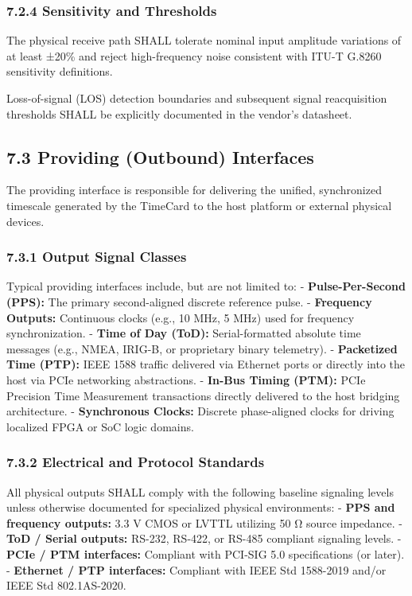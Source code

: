 \documentclass[
]{article}
\begin{document}
\subsubsection{7.2.4 Sensitivity and
Thresholds}\label{sensitivity-and-thresholds}

The physical receive path SHALL tolerate nominal input amplitude
variations of at least ±20\% and reject high-frequency noise consistent
with ITU-T G.8260 sensitivity definitions.

Loss-of-signal (LOS) detection boundaries and subsequent signal
reacquisition thresholds SHALL be explicitly documented in the vendor's
datasheet.

\subsection{7.3 Providing (Outbound)
Interfaces}\label{providing-outbound-interfaces}

The providing interface is responsible for delivering the unified,
synchronized timescale generated by the TimeCard to the host platform or
external physical devices.

\subsubsection{7.3.1 Output Signal Classes}\label{output-signal-classes}

Typical providing interfaces include, but are not limited to: -
\textbf{Pulse-Per-Second (PPS):} The primary second-aligned discrete
reference pulse. - \textbf{Frequency Outputs:} Continuous clocks (e.g.,
10 MHz, 5 MHz) used for frequency synchronization. - \textbf{Time of Day
(ToD):} Serial-formatted absolute time messages (e.g., NMEA, IRIG-B, or
proprietary binary telemetry). - \textbf{Packetized Time (PTP):} IEEE
1588 traffic delivered via Ethernet ports or directly into the host via
PCIe networking abstractions. - \textbf{In-Bus Timing (PTM):} PCIe
Precision Time Measurement transactions directly delivered to the host
bridging architecture. - \textbf{Synchronous Clocks:} Discrete
phase-aligned clocks for driving localized FPGA or SoC logic domains.

\subsubsection{7.3.2 Electrical and Protocol
Standards}\label{electrical-and-protocol-standards}

All physical outputs SHALL comply with the following baseline signaling
levels unless otherwise documented for specialized physical
environments: - \textbf{PPS and frequency outputs:} 3.3 V CMOS or LVTTL
utilizing 50 Ω source impedance. - \textbf{ToD / Serial outputs:}
RS-232, RS-422, or RS-485 compliant signaling levels. - \textbf{PCIe /
PTM interfaces:} Compliant with PCI-SIG 5.0 specifications (or later). -
\textbf{Ethernet / PTP interfaces:} Compliant with IEEE Std 1588-2019
and/or IEEE Std 802.1AS-2020.
\end{document}
